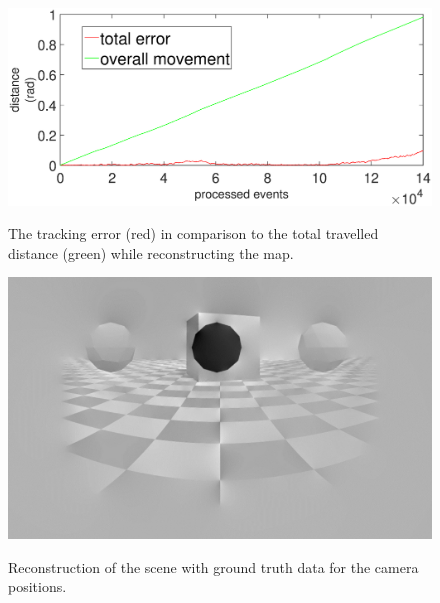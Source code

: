 \begin{figure}
\includegraphics[width=\linewidth]{images/Tracking_error_during_reconstruction.eps}
\label{fig:tracking_error_reconstruction}
\caption{The tracking error (red) in comparison to the total travelled distance (green)
while reconstructing the map.
}
\end{figure}

\begin{figure}
\includegraphics[width=\linewidth]{images/simulation_reconstruction.jpg}
\label{fig:reconstruction_only}
\caption{Reconstruction of the scene with ground truth data for the camera positions.}
\end{figure}

